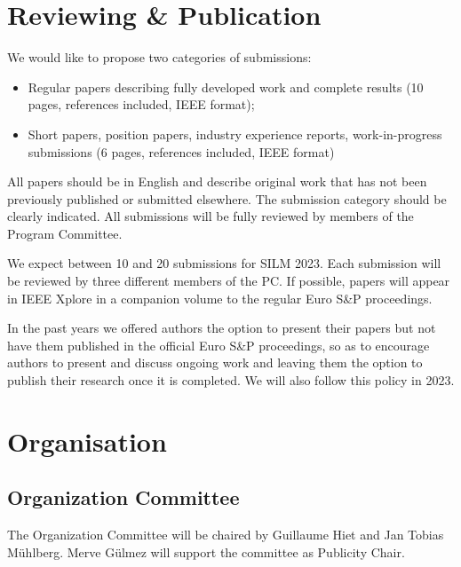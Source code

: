 \documentclass[a4paper,11pt]{article}
\newcommand{\SILMYear}{2023}
\begin{document}
\section{Reviewing \& Publication}
%
We would like to propose two categories of submissions:
%
\begin{itemize}
%
    \item Regular papers describing fully developed work and complete
results (10 pages, references included, IEEE format);
%
    \item Short papers, position papers, industry experience reports,
work-in-progress submissions (6 pages, references included, IEEE format)
%
\end{itemize}

All papers should be in English and describe original work that has not
been previously published or submitted elsewhere. The submission category
should be clearly indicated. All submissions will be fully reviewed by
members of the Program Committee.

We expect between 10 and 20 submissions for SILM \SILMYear{}. Each
submission will be reviewed by three different members of the PC.  If
possible, papers will appear in IEEE Xplore in a companion volume to the
regular Euro S\&P proceedings.

In the past years we offered authors the option to present their papers but
not have them published in the official Euro S\&P proceedings, so as to
encourage authors to present and discuss ongoing work and leaving them the
option to publish their research once it is completed. We will also follow
this policy in \SILMYear{}.


\section{Organisation}
%
\subsection{Organization Committee}
%
The Organization Committee will be chaired by Guillaume Hiet and Jan Tobias
M\"uhlberg. Merve G\"ulmez will support the committee as Publicity Chair.
\end{document}
